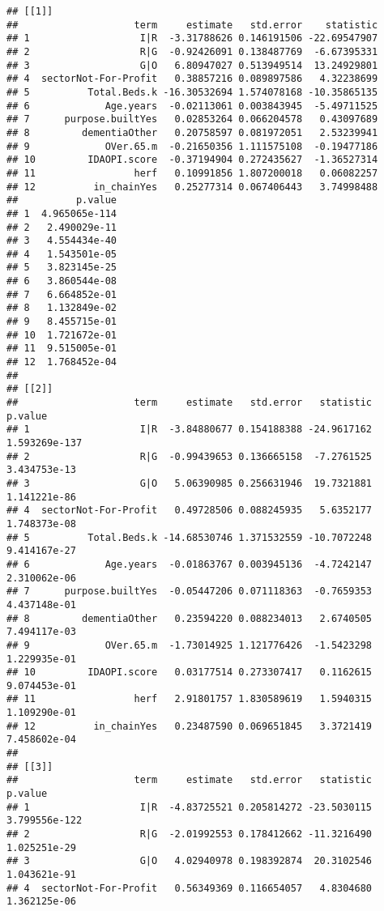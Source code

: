 \documentclass[]{article}
\begin{document}
\begin{verbatim}
## [[1]]
##                    term     estimate   std.error    statistic
## 1                   I|R  -3.31788626 0.146191506 -22.69547907
## 2                   R|G  -0.92426091 0.138487769  -6.67395331
## 3                   G|O   6.80947027 0.513949514  13.24929801
## 4  sectorNot-For-Profit   0.38857216 0.089897586   4.32238699
## 5          Total.Beds.k -16.30532694 1.574078168 -10.35865135
## 6             Age.years  -0.02113061 0.003843945  -5.49711525
## 7      purpose.builtYes   0.02853264 0.066204578   0.43097689
## 8         dementiaOther   0.20758597 0.081972051   2.53239941
## 9             OVer.65.m  -0.21650356 1.111575108  -0.19477186
## 10         IDAOPI.score  -0.37194904 0.272435627  -1.36527314
## 11                 herf   0.10991856 1.807200018   0.06082257
## 12          in_chainYes   0.25277314 0.067406443   3.74998488
##          p.value
## 1  4.965065e-114
## 2   2.490029e-11
## 3   4.554434e-40
## 4   1.543501e-05
## 5   3.823145e-25
## 6   3.860544e-08
## 7   6.664852e-01
## 8   1.132849e-02
## 9   8.455715e-01
## 10  1.721672e-01
## 11  9.515005e-01
## 12  1.768452e-04
## 
## [[2]]
##                    term     estimate   std.error   statistic       p.value
## 1                   I|R  -3.84880677 0.154188388 -24.9617162 1.593269e-137
## 2                   R|G  -0.99439653 0.136665158  -7.2761525  3.434753e-13
## 3                   G|O   5.06390985 0.256631946  19.7321881  1.141221e-86
## 4  sectorNot-For-Profit   0.49728506 0.088245935   5.6352177  1.748373e-08
## 5          Total.Beds.k -14.68530746 1.371532559 -10.7072248  9.414167e-27
## 6             Age.years  -0.01863767 0.003945136  -4.7242147  2.310062e-06
## 7      purpose.builtYes  -0.05447206 0.071118363  -0.7659353  4.437148e-01
## 8         dementiaOther   0.23594220 0.088234013   2.6740505  7.494117e-03
## 9             OVer.65.m  -1.73014925 1.121776426  -1.5423298  1.229935e-01
## 10         IDAOPI.score   0.03177514 0.273307417   0.1162615  9.074453e-01
## 11                 herf   2.91801757 1.830589619   1.5940315  1.109290e-01
## 12          in_chainYes   0.23487590 0.069651845   3.3721419  7.458602e-04
## 
## [[3]]
##                    term     estimate   std.error   statistic       p.value
## 1                   I|R  -4.83725521 0.205814272 -23.5030115 3.799556e-122
## 2                   R|G  -2.01992553 0.178412662 -11.3216490  1.025251e-29
## 3                   G|O   4.02940978 0.198392874  20.3102546  1.043621e-91
## 4  sectorNot-For-Profit   0.56349369 0.116654057   4.8304680  1.362125e-06

\end{verbatim}
\end{document}
